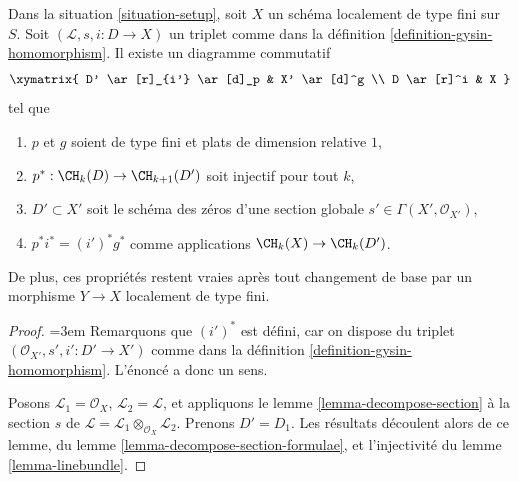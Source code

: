\begin{lemma}
\label{lemma-normal-cone-effective-Cartier}
Dans la situation \ref{situation-setup}, soit $X$ un schéma localement
de type fini sur $S$. Soit $(\mathcal{L}, s, i : D \to X)$
un triplet comme dans la définition \ref{definition-gysin-homomorphism}.
Il existe un diagramme commutatif
$$
\xymatrix{
D' \ar[r]_{i'} \ar[d]_p & X' \ar[d]^g \\
D \ar[r]^i & X
}
$$
tel que
\begin{enumerate}
\item $p$ et $g$ soient de type fini et plats de dimension relative $1$,
\item $p^* : \CH_k(D) \to \CH_{k + 1}(D')$ soit injectif pour tout $k$,
\item $D' \subset X'$ soit le schéma des zéros d'une section globale
$s' \in \Gamma(X', \mathcal{O}_{X'})$,
\item $p^*i^* = (i')^*g^*$ comme applications $\CH_k(X) \to \CH_k(D')$.
\end{enumerate}
De plus, ces propriétés restent vraies après tout changement de base
par un morphisme $Y \to X$ localement de type fini.
\end{lemma}

\begin{proof}
{\emergencystretch=3em Remarquons que $(i')^*$ est défini, car on dispose du triplet
$(\mathcal{O}_{X'}, s', i' : D' \to X')$ comme dans la
définition \ref{definition-gysin-homomorphism}. L'énoncé a donc un sens.\par}

\medskip\noindent
Posons $\mathcal{L}_1 = \mathcal{O}_X$, $\mathcal{L}_2 = \mathcal{L}$,
et appliquons le lemme \ref{lemma-decompose-section} à la section $s$ de
$\mathcal{L} = \mathcal{L}_1 \otimes_{\mathcal{O}_X} \mathcal{L}_2$.
Prenons $D' = D_1$. Les résultats découlent alors de ce lemme, du
lemme \ref{lemma-decompose-section-formulae},
et l'injectivité du
lemme \ref{lemma-linebundle}.
\end{proof}


